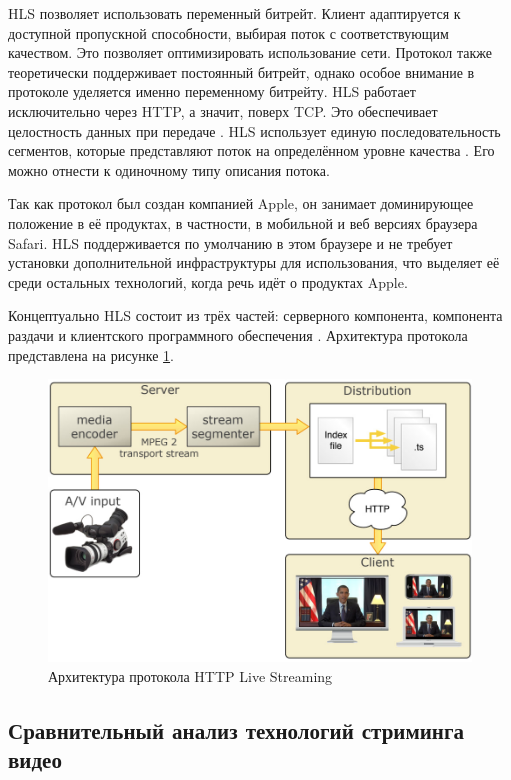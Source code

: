 	HLS позволяет использовать переменный битрейт. Клиент адаптируется к доступной пропускной способности, выбирая поток с соответствующим качеством. Это позволяет оптимизировать использование сети. Протокол также теоретически поддерживает постоянный битрейт, однако особое внимание в протоколе уделяется именно переменному битрейту. HLS работает исключительно через HTTP, а значит, поверх TCP. Это обеспечивает целостность данных при передаче \cite{rfcHls}. HLS использует единую последовательность сегментов, которые представляют поток на определённом уровне качества \cite{fecheyrHlsReview}. Его можно отнести к одиночному типу описания потока.
	
	Так как протокол был создан компанией Apple, он занимает доминирующее положение в её продуктах, в частности, в мобильной и веб версиях браузера Safari. HLS поддерживается по умолчанию в этом браузере и не требует установки дополнительной инфраструктуры для использования, что выделяет её среди остальных технологий, когда речь идёт о продуктах Apple.
	
	Концептуально HLS состоит из трёх частей: серверного компонента, компонента раздачи и клиентского программного обеспечения \cite{fecheyrHlsReview}. Архитектура протокола представлена на рисунке \ref{fig:hls_architecture}.

	\begin{figure}[ht!] 
		\center
		\includegraphics [scale=0.6] {my_folder/images//hls_architecture}
		\caption{Архитектура протокола HTTP Live Streaming \cite{fecheyrHlsReview}} 
		\label{fig:hls_architecture}  
	\end{figure}

\subsection{Сравнительный анализ технологий стриминга видео}

